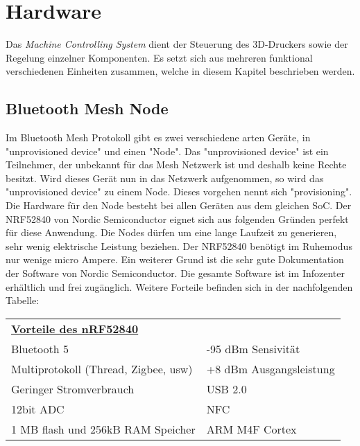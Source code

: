 \clearpage
\section{Hardware}\label{sec:Hardware}
Das \textit{Machine Controlling System} dient der Steuerung des 3D-Druckers sowie der Regelung einzelner Komponenten. Es setzt sich aus mehreren funktional verschiedenen Einheiten zusammen, welche in diesem Kapitel beschrieben werden.


\subsection{Bluetooth Mesh Node}\label{subsec:BMN}
Im Bluetooth Mesh Protokoll gibt es zwei verschiedene arten Geräte, in "unprovisioned device" und einen "Node". Das "unprovisioned device" ist ein Teilnehmer, der unbekannt für das Mesh Netzwerk ist und deshalb keine Rechte besitzt. Wird dieses Gerät nun in das Netzwerk aufgenommen, so wird das "unprovisioned device" zu einem Node. Dieses vorgehen nennt sich "provisioning". Die Hardware für den Node besteht bei allen Geräten aus dem gleichen SoC. Der NRF52840 von Nordic Semiconductor eignet sich aus folgenden Gründen perfekt für diese Anwendung. Die Nodes dürfen um eine lange Laufzeit zu generieren, sehr wenig elektrische Leistung beziehen. Der NRF52840 benötigt im Ruhemodus nur wenige micro Ampere. Ein weiterer Grund ist die sehr gute Dokumentation der Software von Nordic Semiconductor. Die gesamte Software ist im Infozenter erhältlich und frei zugänglich. Weitere Forteile befinden sich in der nachfolgenden Tabelle:

\begin{table}[h]
	\begin{tabular}{ll}
		\multicolumn{2}{l}{{\ul \textbf{Vorteile des nRF52840}}}       \\
		Bluetooth 5                          & -95 dBm Sensivität      \\
		Multiprotokoll (Thread, Zigbee, usw) & +8 dBm Ausgangsleistung \\
		Geringer Stromverbrauch              & USB 2.0                 \\
		12bit ADC                            & NFC                     \\
		1 MB flash und 256kB RAM Speicher    & ARM M4F Cortex         
	\end{tabular}
\end{table}

